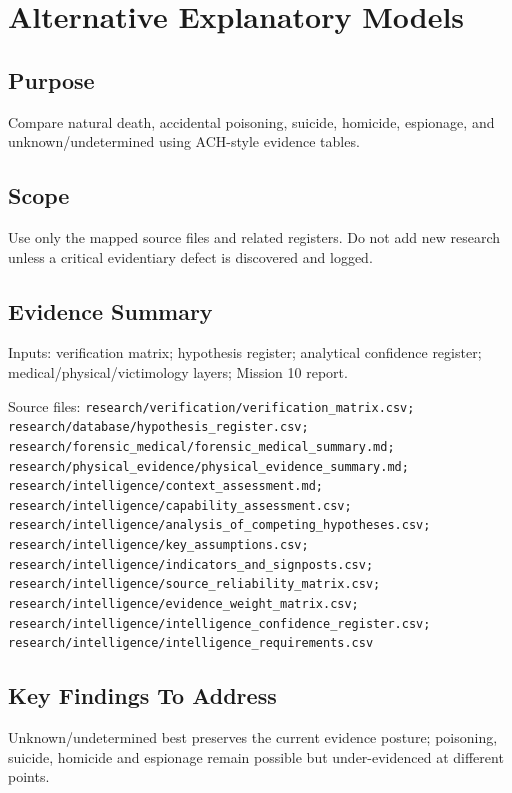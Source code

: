 
\chapter{Alternative Explanatory Models}
\label{chap:11-alternative-models}


\section{Purpose}
Compare natural death, accidental poisoning, suicide, homicide, espionage, and unknown/undetermined using ACH-style evidence tables.

\section{Scope}
Use only the mapped source files and related registers. Do not add new research unless a critical evidentiary defect is discovered and logged.

\section{Evidence Summary}
Inputs: verification matrix; hypothesis register; analytical confidence register; medical/physical/victimology layers; Mission 10 report.

Source files: \texttt{research/verification/verification_matrix.csv; research/database/hypothesis_register.csv; research/forensic_medical/forensic_medical_summary.md; research/physical_evidence/physical_evidence_summary.md; research/intelligence/context_assessment.md; research/intelligence/capability_assessment.csv; research/intelligence/analysis_of_competing_hypotheses.csv; research/intelligence/key_assumptions.csv; research/intelligence/indicators_and_signposts.csv; research/intelligence/source_reliability_matrix.csv; research/intelligence/evidence_weight_matrix.csv; research/intelligence/intelligence_confidence_register.csv; research/intelligence/intelligence_requirements.csv}

\section{Key Findings To Address}
Unknown/undetermined best preserves the current evidence posture; poisoning, suicide, homicide and espionage remain possible but under-evidenced at different points.

